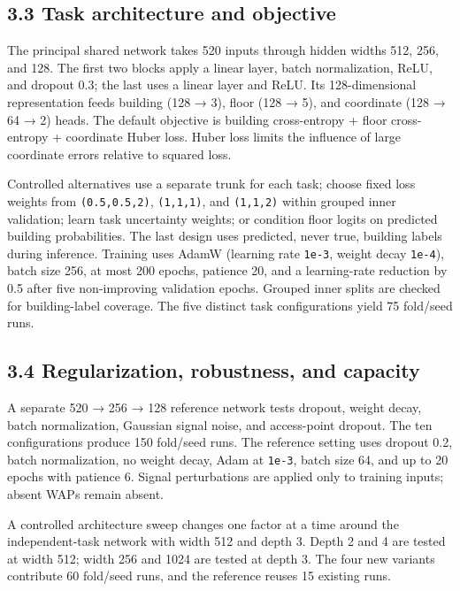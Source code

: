 \documentclass[
  10pt,
  a4paper,
]{article}
\begin{document}
\subsection{3.3 Task architecture and
objective}\label{task-architecture-and-objective}

The principal shared network takes 520 inputs through hidden widths 512,
256, and 128. The first two blocks apply a linear layer, batch
normalization, ReLU, and dropout 0.3; the last uses a linear layer and
ReLU. Its 128-dimensional representation feeds building (128 → 3), floor
(128 → 5), and coordinate (128 → 64 → 2) heads. The default objective is
building cross-entropy + floor cross-entropy + coordinate Huber loss.
Huber loss limits the influence of large coordinate errors relative to
squared loss.

Controlled alternatives use a separate trunk for each task; choose fixed
loss weights from \texttt{(0.5,0.5,2)}, \texttt{(1,1,1)}, and
\texttt{(1,1,2)} within grouped inner validation; learn task uncertainty
weights; or condition floor logits on predicted building probabilities.
The last design uses predicted, never true, building labels during
inference. Training uses AdamW (learning rate \texttt{1e-3}, weight
decay \texttt{1e-4}), batch size 256, at most 200 epochs, patience 20,
and a learning-rate reduction by 0.5 after five non-improving validation
epochs. Grouped inner splits are checked for building-label coverage.
The five distinct task configurations yield 75 fold/seed runs.

\subsection{3.4 Regularization, robustness, and
capacity}\label{regularization-robustness-and-capacity}

A separate 520 → 256 → 128 reference network tests dropout, weight
decay, batch normalization, Gaussian signal noise, and access-point
dropout. The ten configurations produce 150 fold/seed runs. The
reference setting uses dropout 0.2, batch normalization, no weight
decay, Adam at \texttt{1e-3}, batch size 64, and up to 20 epochs with
patience 6. Signal perturbations are applied only to training inputs;
absent WAPs remain absent.

A controlled architecture sweep changes one factor at a time around the
independent-task network with width 512 and depth 3. Depth 2 and 4 are
tested at width 512; width 256 and 1024 are tested at depth 3. The four
new variants contribute 60 fold/seed runs, and the reference reuses 15
existing runs.
\end{document}
